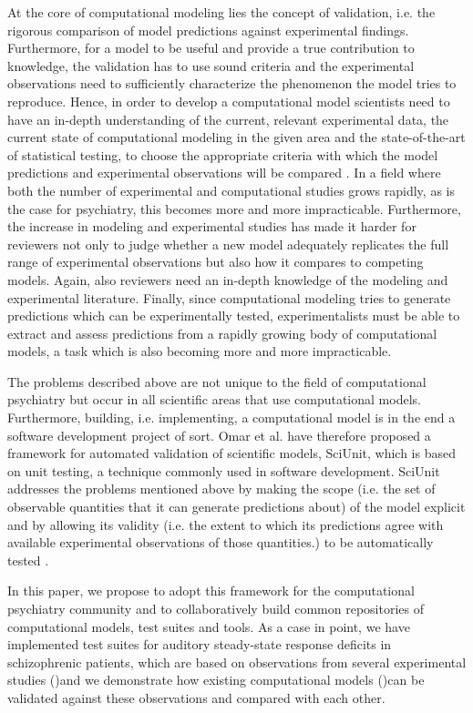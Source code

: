 \documentclass[a4paper,10pt]{article}
\begin{document}
At the core of computational modeling lies the concept of validation, i.e. the rigorous comparison of model predictions 
against experimental findings. Furthermore, for a model to be useful and provide a true contribution to knowledge, the validation has to 
use sound criteria and the experimental observations need to sufficiently characterize the phenomenon the model tries to reproduce.
Hence, in order to develop a computational model scientists need to have an in-depth understanding of the current, relevant experimental data, 
the current state of computational modeling in the given area and the state-of-the-art of statistical testing, to choose the appropriate criteria
with which the model predictions and experimental observations will be compared \cite{Gerkin2013,Sarma2016}. In a field where both the number of experimental 
and computational
studies grows rapidly, as is the case for psychiatry, this becomes more and more impracticable.
Furthermore, the increase in modeling and experimental studies has made it harder for reviewers not only to judge whether a new model adequately 
replicates the full range of experimental observations but also how it compares to competing models. Again, also reviewers need an 
in-depth knowledge of the modeling
and experimental literature.
Finally, since computational modeling tries to generate predictions which can be experimentally tested, experimentalists must be able 
to extract and assess predictions from a rapidly growing body of computational models, a task which is also becoming more and more impracticable.

The problems described above are not unique to the field of computational psychiatry but occur in all scientific areas that use computational models.
Furthermore, building, i.e. implementing, a computational model is in the end a software development project of sort. Omar et al. \cite{Omar2014}
have therefore
proposed a framework for automated validation of scientific models, SciUnit, which is based on unit testing, a technique commonly used in software 
development.
SciUnit addresses the problems mentioned above by making the scope (i.e. the set of observable
quantities that it can generate predictions about) of the model explicit and by allowing its validity (i.e. the extent to which its predictions
agree with available experimental observations of those quantities.) to be automatically tested \cite{Omar2014}.

In this paper, we  propose to adopt this framework for the computational psychiatry community and to collaboratively build
common repositories of computational models, test suites and tools.
As a case in point, we have implemented test suites for auditory steady-state response deficits in schizophrenic patients, which are based on 
observations from
several experimental studies (\cite{Krishnan2009,Vierling2008,Kwon1999})and we demonstrate
how existing computational models (\cite{Metzner2016,Beeman2013,Vierling2008,Metzner2017})can be validated against these observations and compared with each 
other.
\end{document}
